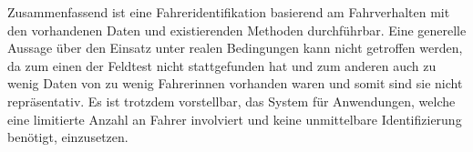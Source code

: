 Zusammenfassend ist eine Fahreridentifikation basierend am Fahrverhalten mit den vorhandenen Daten und existierenden Methoden durchführbar. Eine generelle Aussage über den Einsatz unter realen Bedingungen kann nicht getroffen werden, da zum einen der Feldtest nicht stattgefunden hat und zum anderen auch zu wenig Daten von zu wenig Fahrerinnen vorhanden waren und somit sind sie nicht repräsentativ. Es ist trotzdem vorstellbar, das System für Anwendungen, welche eine limitierte Anzahl an Fahrer involviert und keine unmittelbare Identifizierung benötigt, einzusetzen.